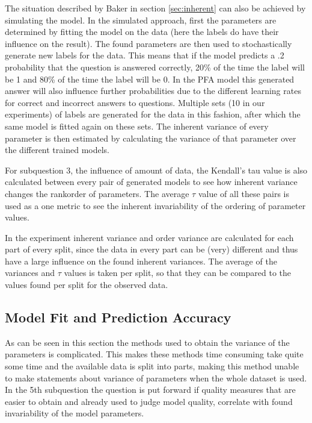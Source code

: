 \documentclass{scrartcl}
\begin{document}
The situation described by Baker in section \ref{sec:inherent} can also be achieved by simulating the model. In the simulated approach, first the parameters are determined by fitting the model on the data (here the labels do have their influence on the result). The found parameters are then used to stochastically generate new labels for the data. This means that if the model predicts a .2 probability that the question is answered correctly, 20\% of the time the label will be 1 and 80\% of the time the label will be 0. In the PFA model this generated answer will also influence further probabilities due to the different learning rates for correct and incorrect answers to questions. Multiple sets (10 in our experiments) of labels are generated for the data in this fashion, after which the same model is fitted again on these sets. The inherent variance of every parameter is then estimated by calculating the variance of that parameter over the different trained models.

For subquestion 3, the influence of amount of data, the Kendall's tau value is also calculated between every pair of generated models to see how inherent variance changes the rankorder of parameters. The average $\tau$ value of all these pairs is used as a one metric to see the inherent invariability of the ordering of parameter values. 

In the experiment inherent variance and order variance are calculated for each part of every split, since the data in every part can be (very) different and thus have a large influence on the found inherent variances. The average of the variances and $\tau$ values is taken per split, so that they can be compared to the values found per split for the observed data. 

\subsection{Model Fit and Prediction Accuracy}
\label{sec:perf}
As can be seen in this section the methods used to obtain the variance of the parameters is complicated. This makes these methods time consuming  take quite some time and the available data is split into parts, making this method unable to make statements about variance of parameters when the whole dataset is used.  In the 5th subquestion the question is put forward if quality measures that are easier to obtain and already used to judge model quality, correlate with found invariability of the model parameters.
\end{document}
